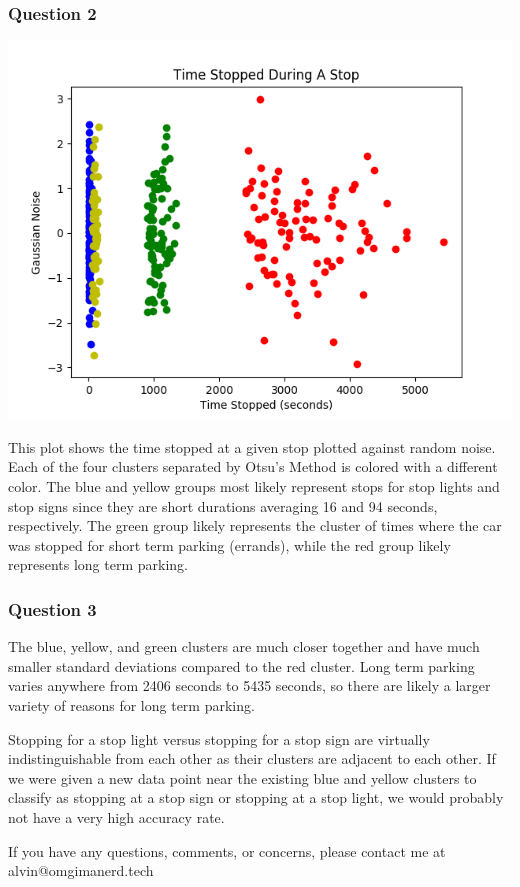 \documentclass{math}
\begin{document}
\subsubsection*{Question 2}
\begin{center}
  \includegraphics[width=15cm]{assets/hw_01_analysis.png}
\end{center}
This plot shows the time stopped at a given stop plotted against random noise.
Each of the four clusters separated by Otsu's Method is colored with a different
color. The blue and yellow groups most likely represent stops for stop lights
and stop signs since they are short durations averaging 16 and 94 seconds,
respectively. The green group likely represents the cluster of times where the
car was stopped for short term parking (errands), while the red group likely
represents long term parking. \par

\subsubsection*{Question 3}
The blue, yellow, and green clusters are much closer together and have much
smaller standard deviations compared to the red cluster. Long term parking
varies anywhere from 2406 seconds to 5435 seconds, so there are likely a larger
variety of reasons for long term parking. \par
Stopping for a stop light versus stopping for a stop sign are virtually
indistinguishable from each other as their clusters are adjacent to each other.
If we were given a new data point near the existing blue and yellow clusters to
classify as stopping at a stop sign or stopping at a stop light, we would
probably not have a very high accuracy rate.

\begin{center}
  If you have any questions, comments, or concerns, please contact me at
  alvin@omgimanerd.tech
\end{center}
\end{document}
